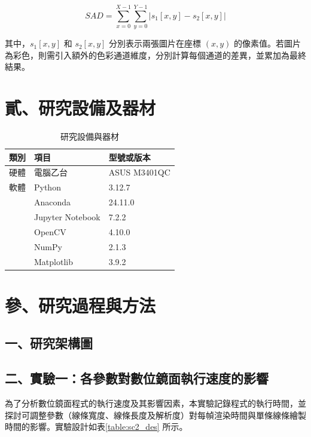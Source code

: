 \documentclass[12pt]{article}
\begin{document}
\[
SAD = \sum_{x=0}^{X-1} \sum_{y=0}^{Y-1} \left| s_1[x, y] - s_2[x, y] \right|
\]

其中，$s_1[x, y]$ 和 $s_2[x, y]$ 分別表示兩張圖片在座標 $(x,y)$ 的像素值。若圖片為彩色，則需引入額外的色彩通道維度，分別計算每個通道的差異，並累加為最終結果。

\newpage

\section{貳、研究設備及器材}

\begin{table}[h]
  \centering
  \caption{研究設備與器材}
  \begin{tabular}{p{2cm}p{5cm}p{5cm}}
    \toprule
    類別 & 項目 & 型號或版本\\
    \midrule
    硬體 & 電腦乙台 & ASUS M3401QC\\
    軟體 & Python & 3.12.7 \\
        & Anaconda & 24.11.0 \\
        & Jupyter Notebook & 7.2.2 \\
        & OpenCV & 4.10.0 \\
        & NumPy & 2.1.3 \\
        & Matplotlib & 3.9.2 \\
    \bottomrule
  \end{tabular}
\end{table}

\newpage

\section{參、研究過程與方法}

\subsection{一、研究架構圖}

\subsection{二、實驗一：各參數對數位鏡面執行速度的影響}

為了分析數位鏡面程式的執行速度及其影響因素，本實驗記錄程式的執行時間，並探討可調整參數（線條寬度、線條長度及解析度）對每幀渲染時間與單條線條繪製時間的影響。實驗設計如表\ref{table:sc2_des} 所示。
\end{document}

